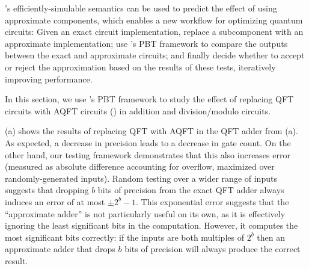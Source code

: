 \oqasm's efficiently-simulable semantics can be used to predict the effect of using approximate components, which enables a new workflow for optimizing quantum circuits:
Given an exact circuit implementation, replace a subcomponent with an
approximate implementation; use \name's PBT framework to compare the
outputs between the exact and approximate circuits; and finally
decide whether to accept or reject the approximation based on the results of these tests, iteratively improving performance.

In this section, we use \name's PBT framework to study the effect of replacing QFT circuits with AQFT circuits () in addition and division/modulo circuits.


(a) shows the results of replacing QFT with AQFT in the QFT adder from (a).
As expected, a decrease in precision leads to a decrease in gate count.
On the other hand, our testing framework demonstrates that this also increases error (measured as absolute difference accounting for overflow, maximized over randomly-generated inputs).
Random testing over a wider range of inputs suggests that dropping $b$ bits of precision from the exact QFT adder always induces an error of at most $\pm 2^b - 1$.
This exponential error suggests that the ``approximate adder'' is not particularly useful on its own, as it is effectively ignoring the least significant bits in the computation.
However, it computes the most significant bits correctly: if the inputs are both multiples of $2^b$ then an approximate adder that drops $b$ bits of precision will always produce the correct result.

